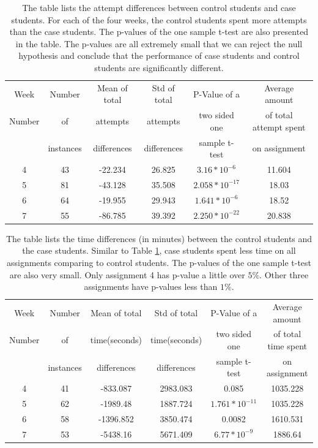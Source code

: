 \documentclass{llncs2e/llncs}
\begin{document}
\begin{table}[th]
\caption{The table lists the attempt differences between control students and case students. For each of the four weeks, the control students spent more attempts than the case students. The p-values of the one sample t-test are also presented in the table. The p-values are all extremely small that we can reject the null hypothesis and conclude that the performance of case students and control students are significantly different.}
\begin{center}
  \begin{tabular}{| c | c | c | c | c | c |}
  \hline
    Week & Number& Mean of total & Std of total &  P-Value of a &Average amount \\
    Number & of & attempts & attempts & two sided one & of total attempt spent\\
     & instances & differences & differences & sample t-test & on assignment   \\ \hline
	4 & 43 & -22.234 & 26.825 & $3.16 * 10^{-6}$ & 11.604\\
	5 & 81 & -43.128 & 35.508 & $2.058 * 10 ^{-17}$ & 18.03\\
	6 & 64 & -19.955 & 29.943 & $1.641 * 10^{-6}$ &  18.52\\
	7 & 55 & -86.785 & 39.392 & $2.250 * 10^{-22}$ & 20.838\\
	\hline
  \end{tabular}
  \label{tab:no_hint}
  \end{center}
\end{table}

\begin{table}
\caption{The table lists the time differences (in minutes) between the control students and the case students. Similar to Table \ref{tab:no_hint}, case students spent less time on all assignments comparing to control students. The p-values of the one sample t-test are also very small. Only assignment 4 has p-value a little over $5\%$. Other three assignments have p-values less than $1\%$.}
\begin{center}
  \begin{tabular}{| c | c | c | c | c | c |}
    \hline
    Week & Number& Mean of total & Std of total &  P-Value of a &Average amount \\
    Number & of & time(seconds) & time(seconds) & two sided one & of total time spent\\
     & instances & differences & differences & sample t-test & on assignment   \\ \hline
	4 & 41 & -833.087 & 2983.083 & 0.085 & 1035.228\\
	5 & 62 & -1989.48 &1887.724 & $1.761 * 10^{-11}$ & 1035.228\\
	6 & 58 & -1396.852 & 3850.474 & 0.0082 & 1610.531 \\
	7 & 53 & -5438.16 & 5671.409 & $6.77 * 10^{-9}$ & 1886.64\\
	\hline
  \end{tabular}
  \label{tab:no_hint_time}
  \end{center}
\end{table}
\end{document}
